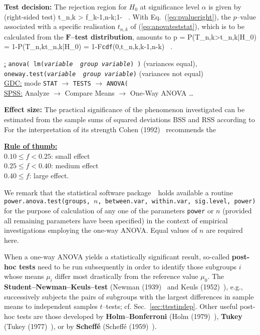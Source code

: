 \medskip
\noindent
\textbf{Test decision:} The rejection region for $H_{0}$ at 
significance level $\alpha$ is given by (right-sided test)
%
\be
t_{n,k} > f_{k-1,n-k;1-\alpha} \ .
\ee
%
With Eq.~(\ref{eq:pvalueright}), the $p$--value associated with a 
specific realisation $t_{n,k}$ of (\ref{eq:anovateststat}), which
is to be calculated from the $\boldsymbol{F}$\textbf{--test
distribution}, amounts to
%
\be
p = P(T_{n,k}>t_{n,k}|H_{0}) = 1-P(T_{n,k}\leq t_{n,k}|H_{0})
= 1-F\texttt{cdf}(0,t_{n,k},k-1,n-k) \ .
\ee
%

\medskip
\noindent
\underline{\R:}
\texttt{anova( lm(\textit{variable}~\texttildelow~\textit{group
variable}) )} (variances equal), \\
\texttt{oneway.test(\textit{variable}~\texttildelow~\textit{group
variable})} (variances not equal) \\
\underline{GDC:} mode \texttt{STAT} $\rightarrow$ \texttt{TESTS}
$\rightarrow$ \texttt{ANOVA(} \\
\underline{SPSS:} Analyze $\rightarrow$ Compare Means
$\rightarrow$ One-Way ANOVA \ldots

\medskip
\noindent
\textbf{Effect size:} The practical significance of the phenomenon investigated can be estimated from the sample sums of squared 
deviations $\text{BSS}$ and $\text{RSS}$ according to
%
\be
{}
\ee
%
For the interpretation of its strength Cohen 
(1992)~ recommends the

\medskip
\noindent
\underline{\textbf{Rule of thumb:}}\\
$0.10 \leq f < 0.25$: small effect\\
$0.25 \leq f < 0.40$: medium effect\\
$0.40 \leq f$: large effect.

\medskip
\noindent
We remark that the statistical software package~\R\ holds 
available a routine \texttt{power.anova.test(groups, $n$, 
between.var, within.var, sig.level, power)} for the purpose of 
calculation of any one of the parameters \texttt{power} or $n$
(provided all remaining parameters have been specified) in the 
context of empirical investigations employing the one-way ANOVA. 
Equal values of $n$ are required here.

\medskip
\noindent
When a one-way ANOVA yields a statistically significant result, 
so-called \textbf{post-hoc tests} need to be run subsequently in 
order to identify those subgroups $i$ whose means $\mu_{i}$ differ 
most drastically from the reference value $\mu_{0}$. The
\textbf{Student--Newman--Keuls--test} (Newman (1939)~
and Keuls (1952)~), e.g., successively subjects the
pairs of subgroups with the largest differences in sample means to 
independent samples $t$--tests; cf. Sec.~\ref{sec:ttestindep}. 
Other useful post-hoc tests are those developed by \textbf{
Holm--Bonferroni} (Holm (1979)~), \textbf{Tukey} (Tukey 
(1977)~), or by \textbf{Schef\-f\'{e}} (Schef\-f\'{e} 
(1959)~).

